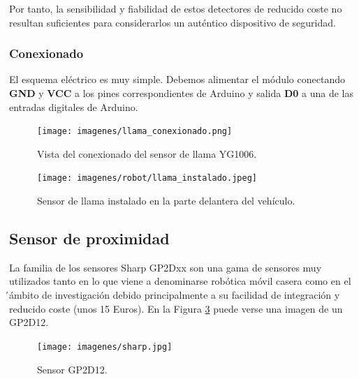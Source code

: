 Por tanto, la sensibilidad y fiabilidad de estos detectores de reducido coste no resultan suficientes para considerarlos un auténtico dispositivo de seguridad.\\
 
\subsubsection{Conexionado}

El esquema eléctrico es muy simple. Debemos alimentar el módulo conectando \textbf{GND} y \textbf{VCC} a los pines correspondientes de Arduino y salida \textbf{D0} a una de las 
entradas digitales de Arduino.\\

 \begin{figure}[H]
  \begin{center}
    \texttt{[image: imagenes/llama\_conexionado.png]}
  \end{center}
  \caption{Vista del conexionado del sensor de llama YG1006.}
  \label{figura:sensor_mq_2_potenciometro}
\end{figure}

 \begin{figure}[H]
  \begin{center}
    \texttt{[image: imagenes/robot/llama\_instalado.jpeg]}
  \end{center}
  \caption{Sensor de llama instalado en la parte delantera del vehículo.}
  \label{figura:sensor_mq_2_potenciometro}
\end{figure}

\subsection{Sensor de proximidad}

La familia de los sensores Sharp GP2Dxx son una gama de sensores muy utilizados tanto en lo que viene a denominarse robótica móvil casera como en el ́ámbito de investigación debido
principalmente a su facilidad de integración y reducido coste (unos 15  Euros). En la Figura \ref{figura:sensor_sharp} puede verse una imagen de un GP2D12.\\

 \begin{figure}[H]
  \begin{center}
    \texttt{[image: imagenes/sharp.jpg]}
  \end{center}
  \caption{Sensor GP2D12.}
  \label{figura:sensor_sharp}
\end{figure}

